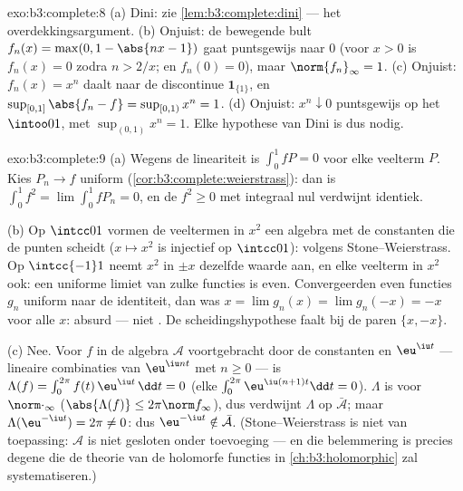 \begin{solution}{exo:b3:complete:8}
(a) Dini: zie \cref{lem:b3:complete:dini} --- het
overdekkingsargument. (b) Onjuist: de bewegende bult $f_n(x) =
\max(0, 1 - \abs{nx - 1})$ gaat puntsgewijs naar $0$ (voor $x > 0$
is $f_n(x) = 0$ zodra $n > 2/x$; en $f_n(0) = 0$), maar
$\norm{f_n}_\infty = 1$. (c) Onjuist: $f_n(x) = x^n$ daalt naar de
discontinue $\mathbf 1_{\{1\}}$, en $\sup_{[0,1]}\abs{f_n - f} =
\sup_{[0,1)} x^n = 1$. (d) Onjuist: $x^n \downarrow 0$
puntsgewijs op het  $\intoo01$, met
$\sup_{(0,1)}x^n = 1$. Elke hypothese van Dini is dus nodig.
\end{solution}

\begin{solution}{exo:b3:complete:9}
(a) Wegens de lineariteit is $\int_0^1 fP = 0$ voor elke veelterm
$P$. Kies $P_n \to f$ uniform
(\cref{cor:b3:complete:weierstrass}): dan is $\int_0^1 f^2 =
\lim\int_0^1 fP_n = 0$, en de  $f^2 \geq 0$ met integraal
nul verdwijnt identiek.

(b) Op $\intcc01$ vormen de veeltermen in $x^2$ een algebra met de
constanten die de punten scheidt ($x \mapsto x^2$ is injectief op
$\intcc01$):  volgens Stone--Weierstrass. Op $\intcc{-1}1$
neemt $x^2$ in $\pm x$ dezelfde waarde aan, en elke veelterm in
$x^2$ ook: een uniforme limiet van zulke functies is even.
Convergeerden even functies $g_n$ uniform naar de identiteit, dan
was $x = \lim g_n(x) = \lim g_n(-x) = -x$ voor alle $x$: absurd
--- niet . De scheidingshypothese faalt bij de paren $\{x,
-x\}$.

(c) Nee. Voor $f$ in de algebra $\mathcal A$ voortgebracht door de
constanten en $\eu^{\iu t}$ --- lineaire combinaties van
$\eu^{\iu nt}$ met $n \geq 0$ --- is $\Lambda(f) =
\int_0^{2\pi}f(t)\,\eu^{\iu t}\,\dd t = 0$ (elke
$\int_0^{2\pi}\eu^{\iu(n+1)t}\dd t = 0$). $\Lambda$ is 
voor $\norm\cdot_\infty$ ($\abs{\Lambda(f)}\leq 2\pi\norm
f_\infty$), dus verdwijnt $\Lambda$ op $\bar{\mathcal A}$; maar
$\Lambda(\eu^{-\iu t}) = 2\pi \neq 0$: dus $\eu^{-\iu t} \notin
\bar{\mathcal A}$. (Stone--Weierstrass is niet van toepassing:
$\mathcal A$ is niet gesloten onder toevoeging --- en die
belemmering is precies degene die de theorie van de holomorfe
functies in \cref{ch:b3:holomorphic} zal systematiseren.)
\end{solution}

